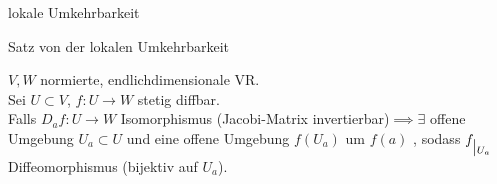 \documentclass[class=article, crop=false]{standalone}
\begin{document}
\begin{zettel}{lokale Umkehrbarkeit}

\begin{flashcard}[svvujhnu]{Satz von der lokalen Umkehrbarkeit}

	\begin{theorem}
		$V,W$ normierte, endlichdimensionale VR.\\
		Sei $U \subset  V$, $f: U \to  W$ stetig diffbar.\\
		Falls $D_a f : U \to W$ Isomorphismus (Jacobi-Matrix invertierbar)$\implies \exists$ offene Umgebung $U_a \subset  U$ und eine offene Umgebung $f(U_a)$ um $f(a)$ , sodass $f_{\big{|_{U_a}}}$ Diffeomorphismus (bijektiv auf $U_a$).
	\end{theorem}
\end{flashcard}


\end{zettel}
\end{document}
